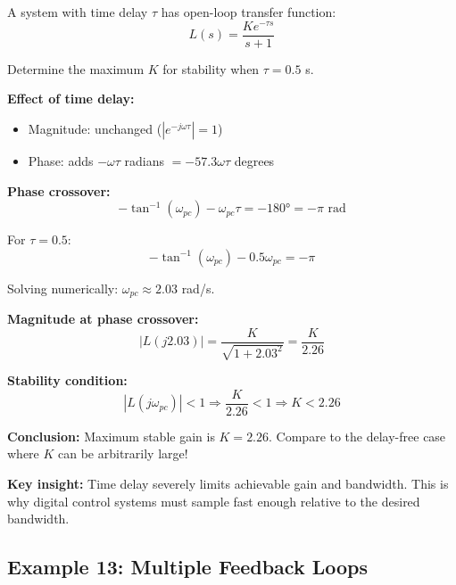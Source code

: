 \begin{example}
\label{ex:time_delay}
A system with time delay $\tau$ has open-loop transfer function:
\begin{equation}
L(s) = \frac{K e^{-\tau s}}{s+1}
\end{equation}

Determine the maximum $K$ for stability when $\tau = 0.5$ s.

\textbf{Effect of time delay:}
\begin{itemize}
    \item Magnitude: unchanged ($|e^{-j\omega\tau}| = 1$)
    \item Phase: adds $-\omega\tau$ radians $= -57.3\omega\tau$ degrees
\end{itemize}

\textbf{Phase crossover:}
\begin{equation}
-\tan^{-1}(\omega_{pc}) - \omega_{pc}\tau = -180° = -\pi \text{ rad}
\end{equation}

For $\tau = 0.5$:
\begin{equation}
-\tan^{-1}(\omega_{pc}) - 0.5\omega_{pc} = -\pi
\end{equation}

Solving numerically: $\omega_{pc} \approx 2.03$ rad/s.

\textbf{Magnitude at phase crossover:}
\begin{equation}
|L(j2.03)| = \frac{K}{\sqrt{1 + 2.03^2}} = \frac{K}{2.26}
\end{equation}

\textbf{Stability condition:}
\begin{equation}
|L(j\omega_{pc})| < 1 \Rightarrow \frac{K}{2.26} < 1 \Rightarrow K < 2.26
\end{equation}

\textbf{Conclusion:} Maximum stable gain is $K = 2.26$. Compare to the delay-free case where $K$ can be arbitrarily large!

\textbf{Key insight:} Time delay severely limits achievable gain and bandwidth. This is why digital control systems must sample fast enough relative to the desired bandwidth.
\end{example}

\subsection{Example 13: Multiple Feedback Loops}

